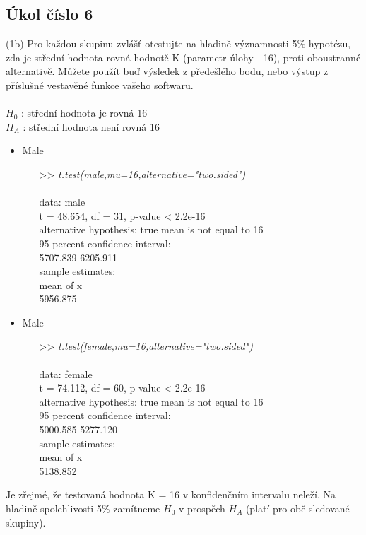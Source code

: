 \documentclass[paper=a4, fontsize=12pt]{scrartcl}
\numberwithin{equation}{section}		%
\numberwithin{figure}{section}			%
\numberwithin{table}{section}				%
\begin{document}
\newpage
\subsection{Úkol číslo 6}
(1b) Pro každou skupinu zvlášť otestujte na hladině významnosti 5\% hypotézu, zda je střední hodnota rovná hodnotě K (parametr úlohy - 16),
proti oboustranné alternativě. Můžete použít buď výsledek z předešlého bodu, nebo výstup z příslušné vestavěné funkce vašeho softwaru.
\\\\
\(H_0\) : střední hodnota je rovná 16\\
\(H_A\) : střední hodnota není rovná 16\\

\begin{itemize}
	\item Male
	\begin{itemize}
		\item[>>]\textit{t.test(male,mu=16,alternative="two.sided")}\\\\
			data:  male\\
			t = 48.654, df = 31, p-value < 2.2e-16\\
			alternative hypothesis: true mean is not equal to 16\\
			95 percent confidence interval:\\
			5707.839 6205.911\\
			sample estimates:\\
			mean of x\\
			5956.875
	\end{itemize}
	\item Male
	\begin{itemize}
		\item[>>]\textit{t.test(female,mu=16,alternative="two.sided")}\\\\
			data:  female\\
			t = 74.112, df = 60, p-value < 2.2e-16\\
			alternative hypothesis: true mean is not equal to 16\\
			95 percent confidence interval:\\
			5000.585 5277.120\\
			sample estimates:\\
			mean of x\\
			5138.852\\
	\end{itemize}
\end{itemize}
\par
Je zřejmé, že testovaná hodnota K = 16 v konfidenčním intervalu neleží. Na hladině spolehlivosti 5\% zamítneme \(H_0\) v prospěch  \(H_A\) (platí pro obě sledované skupiny).
\end{document}
